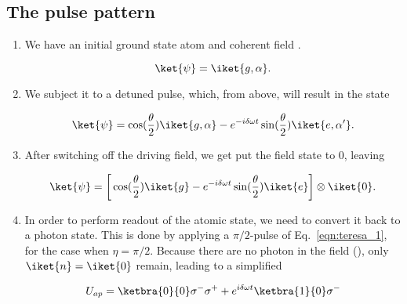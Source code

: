   \subsection{The pulse pattern}
  \begin{enumerate}
  \item We have  an initial ground state  atom  and
    coherent field \iket{\alpha}.
		
		\begin{equation}\label{key}
                  \ket{\psi} = \iket{g,\alpha}.
		\end{equation}
		
              \item  We  subject  it to  a  detuned  pulse,
                which, from above, will result in the state
		
		\begin{equation}\label{key}
                  \ket{\psi} = \cos(\frac{\theta}{2})\iket{g,\alpha} - e^{-i\delta\omega t}\sin(\frac{\theta}{2})\iket{e,\alpha'}.
		\end{equation}
		
              \item After switching  off the driving field,
                we get put the field state to 0, leaving
		
		\begin{equation}\label{eqn:teresa_3}
                  \ket{\psi} = \bigg[\cos(\frac{\theta}{2})\iket{g} - e^{-i\delta\omega t}\sin(\frac{\theta}{2})\iket{e}\bigg]\otimes \iket{0}.
		\end{equation}
		
		\noindent  {}
		
              \item  In order  to  perform  readout of  the
                atomic state, we need to convert it back to
                a photon state. This  is done by applying a
                $         \pi/2          $-pulse         of
                Eq.~\eqref{eqn:teresa_1}, for the case when
                $  \eta =  \pi/2 $.   Because there  are no
                photon    in    the   field    (),
                only  $  \iket{n}   =  \iket{0}  $  remain,
                leading to a simplified
		
		\begin{equation}\label{key}
                  U_{ap} = \ketbra{0}{0}\sigma^{-}\sigma^{+} + e^{i\delta\omega t}\ketbra{1}{0}\sigma^{-}
		\end{equation}
		

\end{enumerate}
